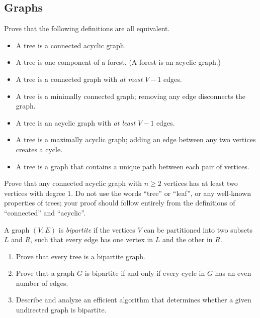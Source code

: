 \begin{exercises}
\subsection*{Graphs}

\item Prove that the following definitions are all equivalent.
\begin{itemize}
\item A tree is a connected acyclic graph.
\item A tree is one component of a forest.
(A forest is an acyclic graph.)
\item A tree is a connected graph with \textit{at most} $V - 1$ edges.
\item A tree is a minimally connected graph; removing any edge disconnects the graph.
\item A tree is an acyclic graph with \textit{at least} $V - 1$ edges.
\item A tree is a maximally acyclic graph; adding an edge between any two vertices creates a cycle.
\item A tree is a graph that contains a unique path between each pair of vertices.
\end{itemize}

\item Prove that any connected acyclic graph with $n \ge 2$ vertices has at least two vertices with degree $1$.
Do not use the words “tree” or “leaf”, or any well-known properties of trees; your proof should follow entirely from the definitions of “connected” and “acyclic”.

\item A graph $(V, E)$ is \textit{bipartite} if the vertices $V$ can be partitioned into two subsets $L$ and $R$, such that every edge has one vertex in $L$ and the other in $R$.
\begin{enumerate}
\item Prove that every tree is a bipartite graph.
\item Prove that a graph $G$ is bipartite if and only if every cycle in $G$ has an even number of edges.
\item Describe and analyze an efficient algorithm that determines whether a given undirected graph is bipartite.
\end{enumerate}


\end{exercises}
